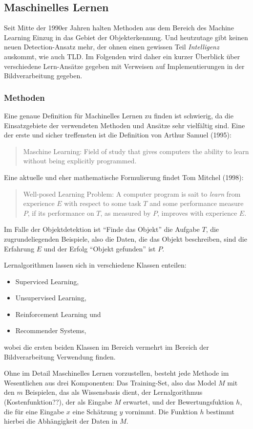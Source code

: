 \subsection{Maschinelles Lernen}
Seit Mitte der 1990er Jahren halten Methoden aus dem Bereich des Machine Learning Einzug in das Gebiet der Objekterkennung. Und heutzutage gibt keinen neuen Detection-Ansatz mehr, der ohnen einen gewissen Teil \textit{Intelligenz} auskommt, wie auch TLD. Im Folgenden wird daher ein kurzer Überblick über verschiedene Lern-Ansätze gegeben mit Verweisen auf Implementierungen in der Bildverarbeitung gegeben.

\subsubsection{Methoden}
Eine genaue Definition für Machinelles Lernen zu finden ist schwierig, da die Einsatzgebiete der verwendeten Methoden und Ansätze sehr vielfältig sind. Eine der erste und sicher treffensten ist die Definition von Arthur Samuel (1995):
\begin{quote}
Maschine Learning: Field of study that gives computers the ability to learn without being explicitly programmed.
\end{quote}
Eine aktuelle und eher mathematische Formulierung findet Tom Mitchel (1998):
\begin{quote}
Well-posed Learning Problem: A computer program is sait to \textit{learn} from experience $E$ with respect to some task $T$ and some performance measure $P$, if its performance on $T$, as measured by $P$, improves with experience $E$.
\end{quote}
Im Falle der Objektdetektion ist ``Finde das Objekt'' die Aufgabe $T$, die zugrundeliegenden Beispiele, also die Daten, die das Objekt beschreiben, sind die Erfahrung $E$ und der Erfolg ``Objekt gefunden'' ist $P$.

Lernalgorithmen lassen sich in verschiedene Klassen enteilen:
\begin{itemize}
\item Superviced Learning,
\item Unsupervised Learning,
\item Reinforcement Learning und
\item Recommender Systems,
\end{itemize}
wobei die ersten beiden Klassen im Bereich vermehrt im Bereich der Bildverarbeitung Verwendung finden.

Ohne im Detail Maschinelles Lernen vorzustellen, besteht jede Methode im Wesentlichen aus drei Komponenten: Das Training-Set, also das Model $M$ mit den $m$ Beispielen, das als Wissensbasis dient, der Lernalgorithmus (Kostenfunktion??), der als Eingabe $M$ erwartet, und der Bewertungsfuktion $h$, die für eine Eingabe $x$ eine Schätzung $y$ vornimmt. Die Funktion $h$ bestimmt hierbei die Abhängigkeit der Daten in $M$.

